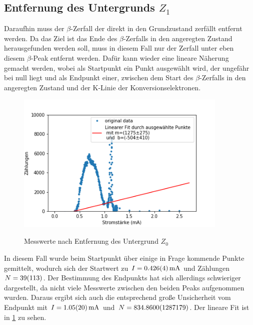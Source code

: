 \subsection{Entfernung des Untergrunds $Z_{1}$}
Daraufhin muss der $\beta$-Zerfall der direkt in den Grundzustand zerfällt entfernt werden. Da das Ziel ist das Ende des $\beta$-Zerfalls in den angeregten Zustand herausgefunden werden soll, muss in diesem Fall nur der Zerfall unter eben diesem $\beta$-Peak entfernt werden. Dafür kann wieder eine lineare Näherung gemacht werden, wobei als Startpunkt ein Punkt ausgewählt wird, der ungefähr bei null liegt und als Endpunkt einer, zwischen dem Start des $\beta$-Zerfalls in den angeregten Zustand und der K-Linie der Konversionselektronen. 

\begin{figure}[h]
	\centering
	\includegraphics[width=0.9\textwidth]{../Messdaten/Z1.png}
	\label{z1}
	\caption{Messwerte nach Entfernung des Untergrund $Z_{0}$}
\end{figure}


In diesem Fall wurde beim Startpunkt über einige in Frage kommende Punkte gemittelt, wodurch sich der Startwert zu $I = \SI{0,426 \pm 0,004}{mA}$ und Zählungen $N = \SI{39 \pm 113}{}$. Der Bestimmung des Endpunkts hat sich allerdings schwieriger dargestellt, da nicht viele Messwerte zwischen den beiden Peaks aufgenommen wurden. Daraus ergibt sich auch die entsprechend große Unsicherheit vom Endpunkt mit $I = \SI{1,05 \pm 0,20}{mA}$ und $N = \SI{834,86 \pm 128,7179}{}$. Der lineare Fit ist in \cref{z1} zu sehen.


